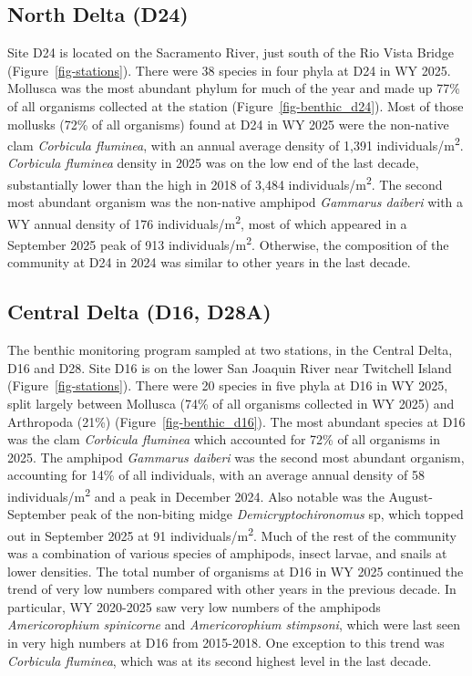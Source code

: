 \documentclass[
  letterpaper,
]{article}
\begin{document}
\subsection{North Delta (D24)}\label{north-delta-d24}

Site D24 is located on the Sacramento River, just south of the Rio Vista
Bridge (Figure~\ref{fig-stations}). There were 38 species in four phyla
at D24 in WY 2025. Mollusca was the most abundant phylum for much of the
year and made up 77\% of all organisms collected at the station
(Figure~\ref{fig-benthic_d24}). Most of those mollusks (72\% of all
organisms) found at D24 in WY 2025 were the non-native clam
\emph{Corbicula fluminea}, with an annual average density of 1,391
individuals/m\textsuperscript{2}. \emph{Corbicula fluminea} density in
2025 was on the low end of the last decade, substantially lower than the
high in 2018 of 3,484 individuals/m\textsuperscript{2}. The second most
abundant organism was the non-native amphipod \emph{Gammarus daiberi}
with a WY annual density of 176 individuals/m\textsuperscript{2}, most
of which appeared in a September 2025 peak of 913
individuals/m\textsuperscript{2}. Otherwise, the composition of the
community at D24 in 2024 was similar to other years in the last decade.

\subsection{Central Delta (D16, D28A)}\label{central-delta-d16-d28a}

The benthic monitoring program sampled at two stations, in the Central
Delta, D16 and D28. Site D16 is on the lower San Joaquin River near
Twitchell Island (Figure~\ref{fig-stations}). There were 20 species in
five phyla at D16 in WY 2025, split largely between Mollusca (74\% of
all organisms collected in WY 2025) and Arthropoda (21\%)
(Figure~\ref{fig-benthic_d16}). The most abundant species at D16 was the
clam \emph{Corbicula fluminea} which accounted for 72\% of all organisms
in 2025. The amphipod \emph{Gammarus daiberi} was the second most
abundant organism, accounting for 14\% of all individuals, with an
average annual density of 58 individuals/m\textsuperscript{2} and a peak
in December 2024. Also notable was the August-September peak of the
non-biting midge \emph{Demicryptochironomus} sp, which topped out in
September 2025 at 91 individuals/m\textsuperscript{2}. Much of the rest
of the community was a combination of various species of amphipods,
insect larvae, and snails at lower densities. The total number of
organisms at D16 in WY 2025 continued the trend of very low numbers
compared with other years in the previous decade. In particular, WY
2020-2025 saw very low numbers of the amphipods \emph{Americorophium
spinicorne} and \emph{Americorophium stimpsoni}, which were last seen in
very high numbers at D16 from 2015-2018. One exception to this trend was
\emph{Corbicula fluminea}, which was at its second highest level in the
last decade.
\end{document}
